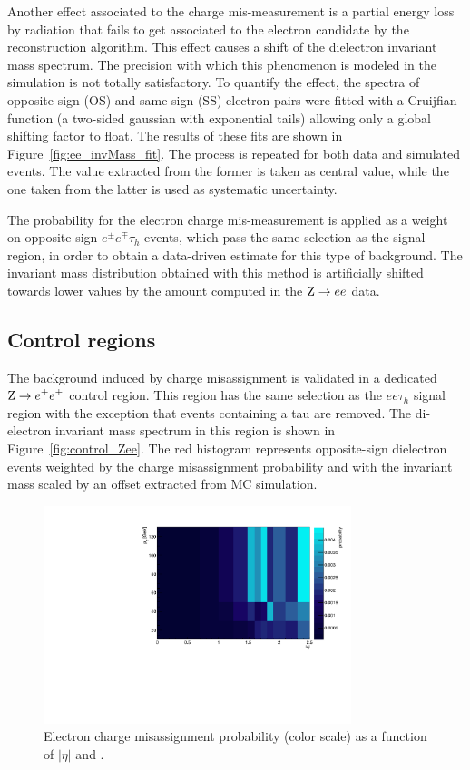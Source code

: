 Another effect associated to the charge mis-measurement is a partial energy loss by radiation that fails to get associated to the electron candidate by the reconstruction algorithm.
This effect causes a shift of the dielectron invariant mass spectrum.
The precision with which this phenomenon is modeled in the simulation is not totally satisfactory. To quantify the effect, the spectra of opposite sign (OS) and same sign (SS) electron pairs were fitted with a Cruijfian function (a two-sided gaussian with exponential tails) allowing only a global shifting factor to float. The results of these fits are shown in Figure~\ref{fig:ee_invMass_fit}. The process is repeated for both data and simulated events. The value extracted from the former is taken as central value, while the one taken from the latter is used as systematic uncertainty.

The probability for the electron charge mis-measurement is applied as a weight on opposite sign $e^\pm e^\mp \tau_h$ events, which pass the same selection as the signal region, in order to obtain a data-driven estimate for this type of background. The invariant mass distribution obtained with this method is artificially shifted towards lower values 
by the amount computed in the $\mathrm{Z} \rightarrow ee$ data.

\subsection{Control regions}

The background induced by charge misassignment is validated in a dedicated $\mathrm{Z} \rightarrow e^\pm e^\pm$ control region.
This region has the same selection as the $ee\tau_h$ signal region with the exception that events containing a tau are removed.
The di-electron invariant mass spectrum in this region is shown in Figure~\ref{fig:control_Zee}. The red histogram represents opposite-sign dielectron events weighted by the charge misassignment probability and with the invariant mass scaled by an offset extracted from MC simulation.

\begin{figure}
  \begin{center}
  \includegraphics[width=0.8\textwidth]{4_Analisys/pics/8TeV/fakerate_fits/charge_flip_prob_map_eid12Medium_h2taucuts.pdf}
  \caption{
  Electron charge misassignment probability (color scale) as a function of $|\eta|$ and \pT.}
  \label{fig:charge_flip_prob_map}
  \end{center}
\end{figure}


